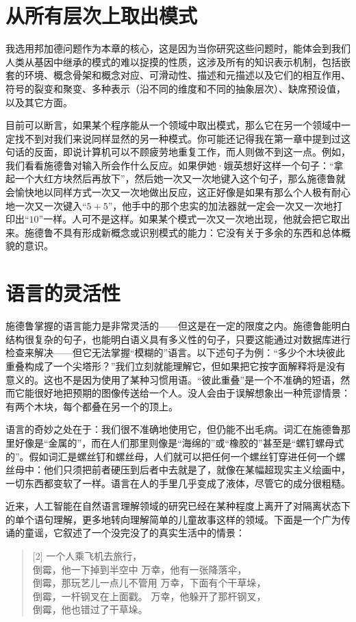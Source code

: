 \section{从所有层次上取出模式}

我选用邦加德问题作为本章的核心，这是因为当你研究这些问题时，能体会到我们人类从基因中继承的模式的难以捉摸的性质，这涉及所有的知识表示机制，包括嵌套的环境、概念骨架和概念对应、可滑动性、描述和元描述以及它们的相互作用、符号的裂变和聚变、多种表示（沿不同的维度和不同的抽象层次）、缺席预设值，以及其它方面。

目前可以断言，如果某个程序能从一个领域中取出模式，那么它在另一个领域中一定找不到对我们来说同样显然的另一种模式。你可能还记得我在第一章中提到过这句话的反面，即说计算机可以不顾疲劳地重复工作，而人则做不到这一点。例如，我们看看施德鲁对输入所会作什么反应。如果伊她·娥英想好这样一个句子：“拿起一个大红方块然后再放下”，然后她一次又一次地键入这个句子，那么施德鲁就会愉快地以同样方式一次又一次地做出反应，这正好像是如果有那么个人极有耐心地一次又一次键入“$5+5$”，他手中的那个忠实的加法器就一定会一次又一次地打印出“$10$”一样。人可不是这样。如果某个模式一次又一次地出现，他就会把它取出来。施德鲁不具有形成新概念或识别模式的能力：它没有关于多余的东西和总体概貌的意识。

\section{语言的灵活性}

施德鲁掌握的语言能力是非常灵活的——但这是在一定的限度之内。施德鲁能明白结构很复杂的句子，也能明白语义具有多义性的句子，只要这能通过对数据库进行检查来解决——但它无法掌握“模糊的”语言。以下述句子为例：“多少个木块彼此重叠构成了一个尖塔形？”我们立刻就能理解它，但如果把它按字面解释将是没有意义的。这也不是因为使用了某种习惯用语。“彼此重叠”是一个不准确的短语，然而它能很好地把预期的图像传送给一个人。没人会由于误解想象出一种荒谬情景：有两个木块，每个都叠在另一个的顶上。

语言的奇妙之处在于：我们很不准确地使用它，但仍能不出毛病。词汇在施德鲁那里好像是“金属的”，而在人们那里则像是“海绵的”或“橡胶的”甚至是“螺钉螺母式的”。假如词汇是螺丝钉和螺丝母，人们就可以把任何一个螺丝钉穿进任何一个螺丝母中：他们只须把前者硬压到后者中去就是了，就像在某幅超现实主义绘画中，一切东西都变软了一样。语言在人的手里几乎变成了液体，尽管它的成分很粗糙。

近来，人工智能在自然语言理解领域的研究已经在某种程度上离开了对隔离状态下的单个语句理解，更多地转向理解简单的儿童故事这样的领域。下面是一个广为传诵的童谣，它叙述了一个没完没了的真实生活中的情景：
\begin{verse}[2]
一个人乘飞机去旅行，\\
倒霉，他一下掉到半空中
万幸，他有一张降落伞，\\
倒霉，那玩艺儿一点儿不管用
万幸，下面有个干草垛，\\
倒霉，一杆钢叉在上面戳。
万幸，他躲开了那杆钢叉，\\
倒霉，他也错过了干草垛。
\end{verse}

